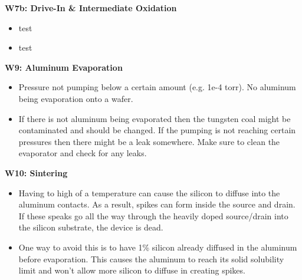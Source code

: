 \documentclass{article}
\begin{document}
\textbf{W7b: Drive-In \& Intermediate Oxidation}
\begin{itemize}
\item test
\item test
\end{itemize}

\textbf{W9: Aluminum Evaporation}
\begin{itemize}
\item Pressure not pumping below a certain amount (e.g. 1e-4 torr). No aluminum being evaporation onto a wafer.
\item If there is not aluminum being evaporated then the tungsten coal might be contaminated and should be changed. If the pumping is not reaching certain pressures then there might be a leak somewhere. Make sure to clean the evaporator and check for any leaks.
\end{itemize}

\textbf{W10: Sintering}
\begin{itemize}
\item Having to high of a temperature can cause the silicon to diffuse into the aluminum contacts. As a result, spikes can form inside the source and drain. If these speaks go all the way through the heavily doped source/drain into the silicon substrate, the device is dead.
\item One way to avoid this is to have 1\% silicon already diffused in the aluminum before evaporation. This causes the aluminum to reach its solid solubility limit and won't allow more silicon to diffuse in creating spikes.
\end{itemize}


\subsection{}
\end{document}
